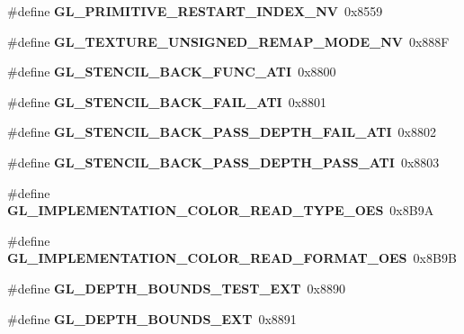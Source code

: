 \begin{DoxyCompactItemize}
\item 
\#define {\bfseries G\+L\+\_\+\+P\+R\+I\+M\+I\+T\+I\+V\+E\+\_\+\+R\+E\+S\+T\+A\+R\+T\+\_\+\+I\+N\+D\+E\+X\+\_\+\+N\+V}~0x8559\label{_s_d_l__opengl_8h_a6d2449fc10865402de703707dd764648}

\item 
\#define {\bfseries G\+L\+\_\+\+T\+E\+X\+T\+U\+R\+E\+\_\+\+U\+N\+S\+I\+G\+N\+E\+D\+\_\+\+R\+E\+M\+A\+P\+\_\+\+M\+O\+D\+E\+\_\+\+N\+V}~0x888\+F\label{_s_d_l__opengl_8h_a4c53aadd37e3245fe37f5b3ee9328961}

\item 
\#define {\bfseries G\+L\+\_\+\+S\+T\+E\+N\+C\+I\+L\+\_\+\+B\+A\+C\+K\+\_\+\+F\+U\+N\+C\+\_\+\+A\+T\+I}~0x8800\label{_s_d_l__opengl_8h_a9493f2a338e099361a0ec2668031b5d1}

\item 
\#define {\bfseries G\+L\+\_\+\+S\+T\+E\+N\+C\+I\+L\+\_\+\+B\+A\+C\+K\+\_\+\+F\+A\+I\+L\+\_\+\+A\+T\+I}~0x8801\label{_s_d_l__opengl_8h_ae23363d61c051ebcc7136e3cd3b49849}

\item 
\#define {\bfseries G\+L\+\_\+\+S\+T\+E\+N\+C\+I\+L\+\_\+\+B\+A\+C\+K\+\_\+\+P\+A\+S\+S\+\_\+\+D\+E\+P\+T\+H\+\_\+\+F\+A\+I\+L\+\_\+\+A\+T\+I}~0x8802\label{_s_d_l__opengl_8h_a13500d38d7d905dfeaaadffd83611a1c}

\item 
\#define {\bfseries G\+L\+\_\+\+S\+T\+E\+N\+C\+I\+L\+\_\+\+B\+A\+C\+K\+\_\+\+P\+A\+S\+S\+\_\+\+D\+E\+P\+T\+H\+\_\+\+P\+A\+S\+S\+\_\+\+A\+T\+I}~0x8803\label{_s_d_l__opengl_8h_ac384dade0b97791c276e1e6b8de7cd2b}

\item 
\#define {\bfseries G\+L\+\_\+\+I\+M\+P\+L\+E\+M\+E\+N\+T\+A\+T\+I\+O\+N\+\_\+\+C\+O\+L\+O\+R\+\_\+\+R\+E\+A\+D\+\_\+\+T\+Y\+P\+E\+\_\+\+O\+E\+S}~0x8\+B9\+A\label{_s_d_l__opengl_8h_a8473c4a073707e095a120939de36babd}

\item 
\#define {\bfseries G\+L\+\_\+\+I\+M\+P\+L\+E\+M\+E\+N\+T\+A\+T\+I\+O\+N\+\_\+\+C\+O\+L\+O\+R\+\_\+\+R\+E\+A\+D\+\_\+\+F\+O\+R\+M\+A\+T\+\_\+\+O\+E\+S}~0x8\+B9\+B\label{_s_d_l__opengl_8h_a8280ea27ca8dc4ce7e62cd70416f6108}

\item 
\#define {\bfseries G\+L\+\_\+\+D\+E\+P\+T\+H\+\_\+\+B\+O\+U\+N\+D\+S\+\_\+\+T\+E\+S\+T\+\_\+\+E\+X\+T}~0x8890\label{_s_d_l__opengl_8h_aff4d49c866f8ddd0c9eaada7e56c3dda}

\item 
\#define {\bfseries G\+L\+\_\+\+D\+E\+P\+T\+H\+\_\+\+B\+O\+U\+N\+D\+S\+\_\+\+E\+X\+T}~0x8891\label{_s_d_l__opengl_8h_a48c74c7c243ce738a109bcc788a11da8}


\end{DoxyCompactItemize}
